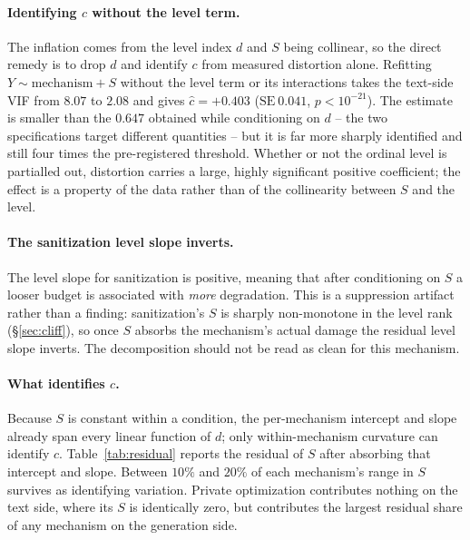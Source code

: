 \paragraph{Identifying $c$ without the level term.}
The inflation comes from the level index $d$ and $S$ being collinear,
so the direct remedy is to drop $d$ and identify $c$ from measured distortion alone.
Refitting $Y \sim \text{mechanism} + S$ without the level term or its interactions takes the text-side VIF from $8.07$ to $2.08$ and gives $\hat c = +0.403$ ($\mathrm{SE}\ 0.041$, $p < 10^{-21}$).
The estimate is smaller than the $0.647$ obtained while conditioning on $d$ -- the two specifications target different quantities -- but it is far more sharply identified and still four times the pre-registered threshold.
Whether or not the ordinal level is partialled out,
distortion carries a large,
highly significant positive coefficient;
the effect is a property of the data rather than of the collinearity between $S$ and the level.

\paragraph{The sanitization level slope inverts.}
The level slope for sanitization is positive,
meaning that after conditioning on $S$ a looser budget is associated with \textit{more} degradation.
This is a suppression artifact rather than a finding:
sanitization's $S$ is sharply non-monotone in the level rank (\S\ref{sec:cliff}),
so once $S$ absorbs the mechanism's actual damage the residual level slope inverts.
The decomposition should not be read as clean for this mechanism.

\paragraph{What identifies $c$.}
Because $S$ is constant within a condition,
the per-mechanism intercept and slope already span every linear function of $d$;
only within-mechanism curvature can identify $c$. Table~\ref{tab:residual} reports the residual of $S$ after absorbing that intercept and slope.
Between $10\%$ and $20\%$ of each mechanism's range in $S$ survives as identifying variation.
Private optimization contributes nothing on the text side,
where its $S$ is identically zero,
but contributes the largest residual share of any mechanism on the generation side.

